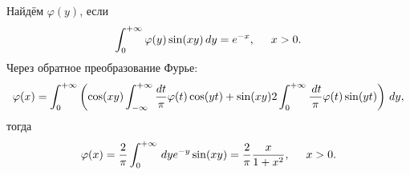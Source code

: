 Найдём $\varphi(y)$, если 
\begin{equation*}
     \int_0^{+\infty} \varphi(y) \sin (xy) \, d y = e^{-x}, \hspace{5 mm} x > 0.
\end{equation*} 
Через обратное преобразование Фурье:
\begin{equation*}
    \varphi(x) = \int_{0}^{+\infty} 
    \left(
        \cos(xy) \int_{-\infty}^{+\infty}  \frac{d t}{\pi} \varphi(t) \cos (y t)
        + 
        \sin (xy) 2 \int_{0}^{+\infty} \frac{\, d t}{\pi} \varphi(t) \sin (y t)
    \right)
    \, d y,
\end{equation*}
тогда
\begin{equation*}
    \varphi(x) = \frac{2}{\pi} \int_0^{+\infty} \, d y e^{-y} \sin(xy) = \frac{2}{\pi} \frac{x}{1+x^2}, \hspace{5 mm} x > 0.
\end{equation*}